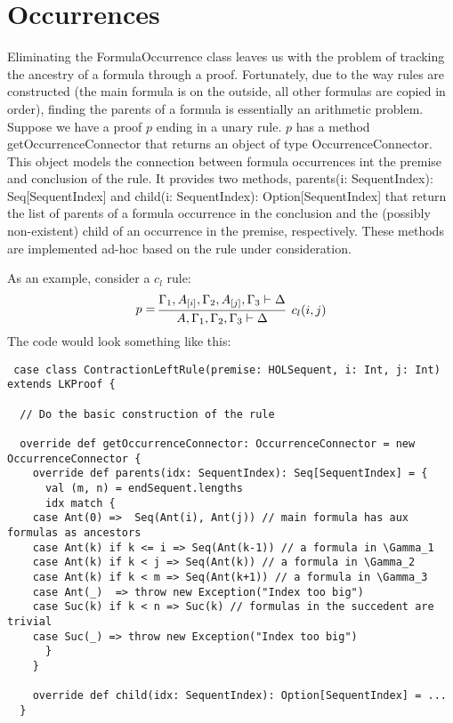\documentclass[11pt,a4paper]{article}
\begin{document}
\section{Occurrences}
Eliminating the FormulaOccurrence class leaves us with the problem of tracking the ancestry of a formula through a proof. Fortunately, due to the way rules are constructed (the main formula is on the outside, all other formulas are copied in order), finding the parents of a formula is essentially an arithmetic problem. Suppose we have a proof $p$ ending in a unary rule. $p$ has a method getOccurrenceConnector that returns an object of type OccurrenceConnector. This object models the connection between formula occurrences int the premise and conclusion of the rule. It provides two methods, parents(i: SequentIndex): Seq[SequentIndex] and child(i: SequentIndex): Option[SequentIndex] that return the list of parents of a formula occurrence in the conclusion and the (possibly non-existent) child of an occurrence in the premise, respectively. These methods are implemented ad-hoc based on the rule under consideration.

As an example, consider a $c_l$ rule:
\begin{align*}
 p = \vcenter{\infer[c_l(i,j)]
 {A, \Gamma_1, \Gamma_2, \Gamma_3 \vdash \Delta}
 {\Gamma_1, A_{[i]}, \Gamma_2, A_{[j]}, \Gamma_3 \vdash \Delta}}
\end{align*}
The code would look something like this:
\begin{lstlisting}
 case class ContractionLeftRule(premise: HOLSequent, i: Int, j: Int) extends LKProof {
 
  // Do the basic construction of the rule
  
  override def getOccurrenceConnector: OccurrenceConnector = new OccurrenceConnector {
    override def parents(idx: SequentIndex): Seq[SequentIndex] = {
      val (m, n) = endSequent.lengths
      idx match {
	case Ant(0) =>  Seq(Ant(i), Ant(j)) // main formula has aux formulas as ancestors
	case Ant(k) if k <= i => Seq(Ant(k-1)) // a formula in \Gamma_1
	case Ant(k) if k < j => Seq(Ant(k)) // a formula in \Gamma_2
	case Ant(k) if k < m => Seq(Ant(k+1)) // a formula in \Gamma_3
	case Ant(_)  => throw new Exception("Index too big")
	case Suc(k) if k < n => Suc(k) // formulas in the succedent are trivial
	case Suc(_) => throw new Exception("Index too big")
      }
    }
    
    override def child(idx: SequentIndex): Option[SequentIndex] = ...
  }
    
\end{lstlisting}
\end{document}

